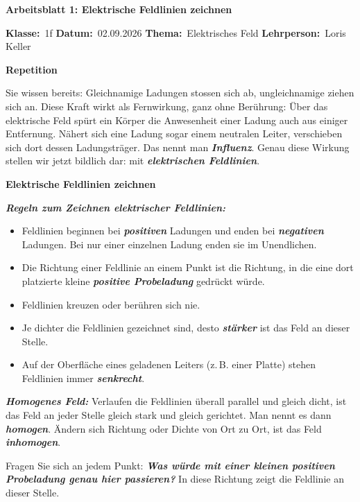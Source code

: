 \documentclass[addpoints,11pt,a4paper]{exam}
\newenvironment{theoriebox}[1][Theorie]{%
  \par\addvspace{10pt}\noindent\textbf{#1}\par\smallskip\noindent
}{%
  \par\addvspace{10pt}
}
\newcommand{\Kopfzeile}[4]{%
  \begin{titlebox}
    {\color{white}\sffamily\bfseries\Large #4}
  \end{titlebox}
  \vspace{0.5em}
  \noindent\textbf{Klasse:}~#1 \hfill \textbf{Datum:}~#2 \hfill \textbf{Thema:}~#3
    \hfill \textbf{Lehrperson:}~Loris Keller
  \vspace{0.8em}
  \lhead{\textcolor{darkgray}{#3}}
  \rhead{\textcolor{darkgray}{#4}}
}
\newcommand{\Klasse}{1f}
\newcommand{\Datum}{02.09.2026}
\newcommand{\Thema}{Elektrisches Feld}
\newcommand{\ArbeitsblattTitel}{Arbeitsblatt 1: Elektrische Feldlinien zeichnen}
\begin{document}
\Kopfzeile{\Klasse}{\Datum}{\Thema}{\ArbeitsblattTitel}

\textbf{Repetition}

Sie wissen bereits: Gleichnamige Ladungen stossen sich ab, ungleichnamige
ziehen sich an. Diese Kraft wirkt als Fernwirkung, ganz ohne Berührung:
Über das elektrische Feld spürt ein Körper die Anwesenheit einer Ladung
auch aus einiger Entfernung. Nähert sich eine Ladung sogar einem
neutralen Leiter, verschieben sich dort dessen Ladungsträger. Das nennt
man \textbf{\emph{Influenz}}. Genau diese Wirkung stellen wir jetzt
bildlich dar: mit \textbf{\emph{elektrischen Feldlinien}}.

\begin{theoriebox}[Elektrische Feldlinien zeichnen]
\textbf{\emph{Regeln zum Zeichnen elektrischer Feldlinien:}}
\begin{itemize}[leftmargin=1.2cm,itemsep=0.2em]
  \item Feldlinien beginnen bei \textbf{\emph{positiven}} Ladungen und enden bei \textbf{\emph{negativen}} Ladungen. Bei nur einer einzelnen Ladung enden sie im Unendlichen.
  \item Die Richtung einer Feldlinie an einem Punkt ist die Richtung, in die eine dort platzierte kleine \textbf{\emph{positive Probeladung}} gedrückt würde.
  \item Feldlinien kreuzen oder berühren sich nie.
  \item Je dichter die Feldlinien gezeichnet sind, desto \textbf{\emph{stärker}} ist das Feld an dieser Stelle.
  \item Auf der Oberfläche eines geladenen Leiters (z.\,B. einer Platte) stehen Feldlinien immer \textbf{\emph{senkrecht}}.
\end{itemize}

\textbf{\emph{Homogenes Feld:}} Verlaufen die Feldlinien überall parallel
und gleich dicht, ist das Feld an jeder Stelle gleich stark und gleich
gerichtet. Man nennt es dann \textbf{\emph{homogen}}. Ändern sich Richtung
oder Dichte von Ort zu Ort, ist das Feld \textbf{\emph{inhomogen}}.

\begin{hinweisbox}
Fragen Sie sich an jedem Punkt: \textbf{\emph{Was würde mit einer kleinen
positiven Probeladung genau hier passieren?}} In diese Richtung zeigt die
Feldlinie an dieser Stelle.
\end{hinweisbox}
\end{theoriebox}
\end{document}
